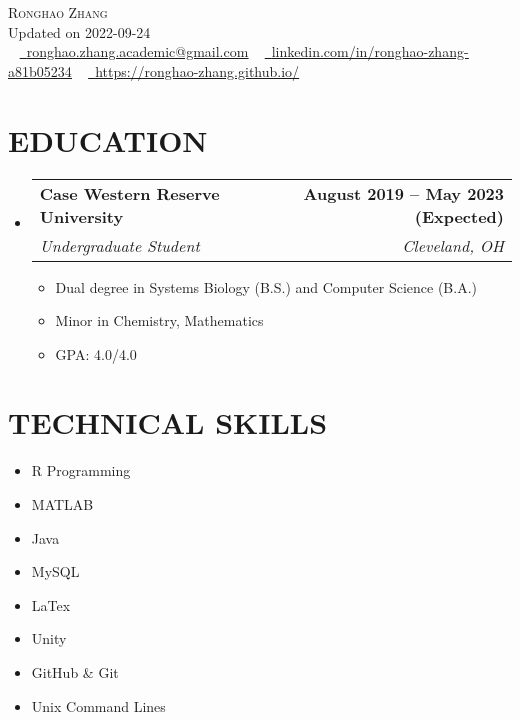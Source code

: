 \documentclass[letterpaper,11pt]{article}
\makeatletter
\newcommand{\resumeItem}[1]{
	\item\small{
		{#1 \vspace{0pt}}
	}
}
\newcommand{\resumeSubheading}[4]{
	\vspace{-2pt}\item
	\begin{tabular*}{1.0\textwidth}[t]{l@{\extracolsep{\fill}}r}
		\textbf{#1} & \textbf{\small #2} \\
		\textit{\small#3} & \textit{\small #4} \\
	\end{tabular*}\vspace{-4pt}
}
\newcommand{\resumeSubHeadingListStart}{\begin{itemize}[leftmargin=0.0in, label={}]}
\newcommand{\resumeSubHeadingListEnd}{\end{itemize}}
\newcommand{\resumeItemListStart}{\begin{itemize}}
\newcommand{\resumeItemListEnd}{\end{itemize}\vspace{-5pt}}
\makeatother
\begin{document}
	
	\begin{center}
		{\Huge \scshape Ronghao Zhang} 
		\\ \vspace{5pt}
		Updated on 2022-09-24
		\\ \vspace{5pt}
		\small \raisebox{-0.1\height} ~ 
		\href{mailto:x@gmail.com}{\raisebox{-0.2\height}\faEnvelope\          \underline{ronghao.zhang.academic@gmail.com}} ~ 
		\href{https://linkedin.com/in//}{\raisebox{-0.2\height}\faLinkedin\     \underline{linkedin.com/in/ronghao-zhang-a81b05234}}  ~
		\href{https://ronghao-zhang.github.io/}{\raisebox{-0.2\height}\faGithub\ \underline{https://ronghao-zhang.github.io/}}
		\vspace{1pt}
	\end{center}
	
	\section{EDUCATION}
	\resumeSubHeadingListStart
	\resumeSubheading
	{Case Western Reserve University}{August 2019 -- May 2023 (Expected)}
	{Undergraduate Student}{Cleveland, OH}
	\resumeItemListStart
	\resumeItem{Dual degree in Systems Biology (B.S.) and Computer Science (B.A.)}
	\resumeItem{Minor in Chemistry, Mathematics}
	\resumeItem{GPA: 4.0/4.0}
	\resumeItemListEnd
	\resumeSubHeadingListEnd
	
	\section{TECHNICAL SKILLS}
	\begin{multicols}{4}
		\begin{itemize}[itemsep=-2pt, parsep=5pt]
			\item\small R Programming
			\item       MATLAB 
			\item       Java
			\item       MySQL
			\item       LaTex
			\item       Unity
			\item       GitHub \& Git 
			\item       Unix Command Lines
			
		\end{itemize}
	\end{multicols}
	\vspace*{2.0\multicolsep}
	\vspace{7pt}
	
\end{document}
